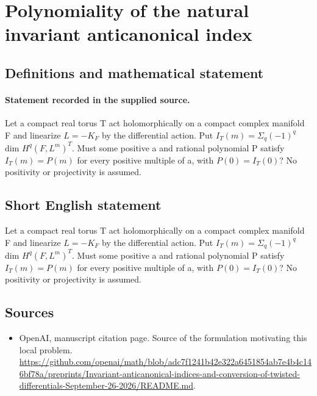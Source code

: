 \documentclass[11pt]{article}
\begin{document}
\section*{Polynomiality of the natural invariant anticanonical index}\label{30007048}
\subsection{Definitions and mathematical statement}
\paragraph{Statement recorded in the supplied source.}
Let a compact real torus T act holomorphically on a compact complex manifold F and linearize $L=-K_F$ by the differential action. Put $I_T(m)=\Sigma _q(-1)^q$ dim $H^q(F,L^m)^T$. Must some positive a and rational polynomial P satisfy $I_T(m)=P(m)$ for every positive multiple of a, with $P(0)=I_T(0)$? No positivity or projectivity is assumed.
\subsection{Short English statement}
Let a compact real torus T act holomorphically on a compact complex manifold F and linearize $L=-K_F$ by the differential action. Put $I_T(m)=\Sigma _q(-1)^q$ dim $H^q(F,L^m)^T$. Must some positive a and rational polynomial P satisfy $I_T(m)=P(m)$ for every positive multiple of a, with $P(0)=I_T(0)$? No positivity or projectivity is assumed.
\subsection{Sources}
\begin{itemize}
\item[S1] OpenAI, manuscript citation page. Source of the formulation motivating this local problem.
\url{https://github.com/openai/math/blob/adc7f1241b42e322a6451854ab7e4b4c146bf78a/preprints/Invariant-anticanonical-indices-and-conversion-of-twisted-differentials-September-26-2026/README.md}.
\end{itemize}
\end{document}
